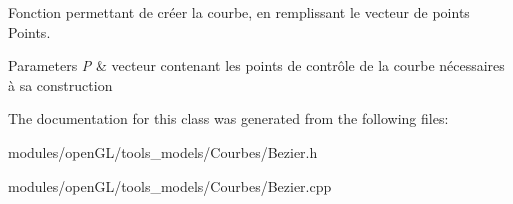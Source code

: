 Fonction permettant de créer la courbe, en remplissant le vecteur de points Points. 


\begin{DoxyParams}{Parameters}
{\em P} & vecteur contenant les points de contrôle de la courbe nécessaires à sa construction \\
\hline
\end{DoxyParams}


The documentation for this class was generated from the following files\-:\begin{DoxyCompactItemize}
\item 
modules/open\-G\-L/tools\-\_\-models/\-Courbes/Bezier.\-h\item 
modules/open\-G\-L/tools\-\_\-models/\-Courbes/Bezier.\-cpp\end{DoxyCompactItemize}
